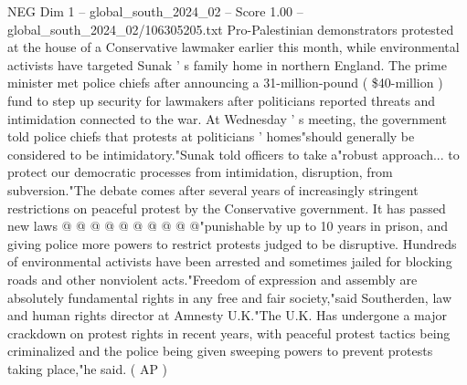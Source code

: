 \begin{textsample}{NEG Dim 1 – global\_south\_2024\_02 – Score 1.00 – global\_south\_2024\_02/106305205.txt}
Pro-Palestinian demonstrators protested at the house of a Conservative lawmaker earlier this month, while environmental activists have targeted Sunak ' s family home in northern England.
The prime minister met police chiefs after announcing a 31-million-pound ( \$40-million ) fund to step up security for lawmakers after politicians reported threats and intimidation connected to the war.
At Wednesday ' s meeting, the government told police chiefs that protests at politicians ' homes"should generally be considered to be intimidatory."Sunak told officers to take a"robust approach... to protect our democratic processes from intimidation, disruption, from subversion."The debate comes after several years of increasingly stringent restrictions on peaceful protest by the Conservative government.
It has passed new laws @ @ @ @ @ @ @ @ @ @"punishable by up to 10 years in prison, and giving police more powers to restrict protests judged to be disruptive.
Hundreds of environmental activists have been arrested and sometimes jailed for blocking roads and other nonviolent acts."Freedom of expression and assembly are absolutely fundamental rights in any free and fair society,"said Southerden, law and human rights director at Amnesty U.K."The U.K.
Has undergone a major crackdown on protest rights in recent years, with peaceful protest tactics being criminalized and the police being given sweeping powers to prevent protests taking place,"he said. ( AP )

\end{textsample}
